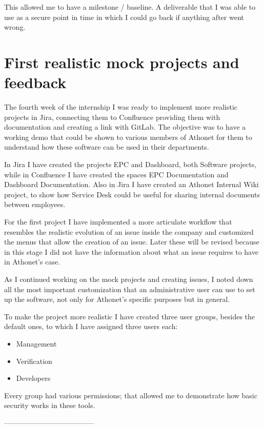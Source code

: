 	This allowed me to have a milestone / baseline.
	A deliverable that I was able to use as a secure point in time in which I could go back if anything after went wrong.
	
\section{First realistic mock projects and feedback}
	
	The fourth week of the internship I was ready to implement more realistic projects in Jira, connecting them to Confluence providing them with documentation and creating a link with GitLab.
	The objective was to have a working demo that could be shown to various members of Athonet for them to understand how these software can be used in their departments.

	In Jira I have created the projects EPC and Dashboard, both Software projects, while in Confluence I have created the spaces EPC Documentation and Dashboard Documentation.
	Also in Jira I have created an Athonet Internal Wiki project, to show how Service Desk could be useful for sharing internal documents between employees.
	
	For the first project I have implemented a more articulate workflow that resembles the realistic evolution of an issue inside the company and customized the menus that allow the creation of an issue.
	Later these will be revised because in this stage I did not have the information about what an issue requires to have in Athonet's case. 
	
	As I continued working on the mock projects and creating issues, I noted down all the most important customization that an administrative user can use to set up the software, not only for Athonet's specific purposes but in general.
	
	To make the project more realistic I have created three user groups, besides the default ones, to which I have assigned three users each:
	\begin{itemize}
		\item Management
		\item Verification
		\item Developers
	\end{itemize}
	
	Every group had various permissions; that allowed me to demonstrate how basic security works in these tools.
	
	
	
	--------------------------------------
	
